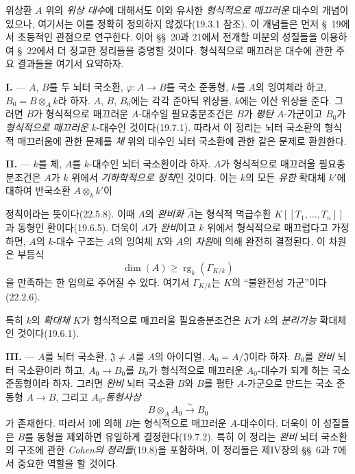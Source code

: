 \begin{env}[19.0.2]
\label{0.19.0.2-fr}
위상환 $A$ 위의 \emph{위상 대수}에 대해서도 이와 유사한
\emph{형식적으로 매끄러운} 대수의 개념이 있으나, 여기서는 이를
정확히 정의하지 않겠다(19.3.1 참조). 이 개념들은 먼저 §~19에서
초등적인 관점으로 연구한다. 이어 §§~20과 21에서 전개할 미분의
성질들을 이용하여 §~22에서 더 정교한 정리들을 증명할 것이다.
형식적으로 매끄러운 대수에 관한 주요 결과들을 여기서 요약하자.

\medskip\noindent\textbf{I.} --- $A$, $B$를 두 뇌터 국소환,
$\varphi:A\to B$를 국소 준동형, $k$를 $A$의 잉여체라 하고,
$B_0=B\otimes_A k$라 하자. $A$, $B$, $B_0$에는 각각 준아딕 위상을,
$k$에는 이산 위상을 준다. 그러면 $B$가 형식적으로 매끄러운
$A$-대수일 필요충분조건은 $B$가 \emph{평탄} $A$-가군이고
$B_0$가 \emph{형식적으로 매끄러운} $k$-대수인 것이다(19.7.1).
따라서 이 정리는 뇌터 국소환의 형식적 매끄러움에 관한 문제를
\emph{체} 위의 대수인 뇌터 국소환에 관한 같은 문제로 환원한다.

\medskip\noindent\textbf{II.} --- $k$를 체, $A$를 $k$-대수인 뇌터
국소환이라 하자. $A$가 형식적으로 매끄러울 필요충분조건은
$A$가 $k$ 위에서 \emph{기하학적으로 정칙}인 것이다. 이는 $k$의
모든 \emph{유한} 확대체 $k'$에 대하여 반국소환
$A\otimes_k k'$이


\noindent 정칙이라는 뜻이다(22.5.8). 이때 $A$의 \emph{완비화}
$\widehat A$는 형식적 멱급수환 $K[[T_1,\ldots,T_n]]$과 동형인
환이다(19.6.5). 더욱이 $A$가 \emph{완비}이고 $k$ 위에서 형식적으로
매끄럽다고 가정하면, $A$의 $k$-대수 구조는 $A$의 잉여체 $K$와
$A$의 \emph{차원}에 의해 완전히 결정된다. 이 차원은 부등식
\[
  \dim(A)\geq \operatorname{rg}_k(\Gamma_{K/k})
\]
을 만족하는 한 임의로 주어질 수 있다. 여기서 $\Gamma_{K/k}$는
$K$의 ``불완전성 가군''이다(22.2.6).

특히 $k$의 \emph{확대체} $K$가 형식적으로 매끄러울 필요충분조건은
$K$가 $k$의 \emph{분리가능} 확대체인 것이다(19.6.1).

\medskip\noindent\textbf{III.} --- $A$를 뇌터 국소환,
$\mathfrak J\ne A$를 $A$의 아이디얼, $A_0=A/\mathfrak J$이라 하자.
$B_0$를 \emph{완비} 뇌터 국소환이라 하고, $A_0\to B_0$를
$B_0$가 형식적으로 매끄러운 $A_0$-대수가 되게 하는 국소 준동형이라
하자. 그러면 \emph{완비} 뇌터 국소환 $B$와 $B$를 평탄
$A$-가군으로 만드는 국소 준동형 $A\to B$, 그리고 $A_0$-\emph{동형사상}
\[
  B\otimes_A A_0\xrightarrow{\sim}B_0
\]
가 존재한다. 따라서 I에 의해 $B$는 형식적으로 매끄러운
$A$-대수이다. 더욱이 이 성질들은 $B$를 동형을 제외하면 유일하게
결정한다(19.7.2). 특히 이 정리는 \emph{완비} 뇌터 국소환의 구조에
관한 \emph{Cohen의 정리들}(19.8)을 포함하며, 이 정리들은 제IV장의
§§~6과 7에서 중요한 역할을 할 것이다.


\end{env}

